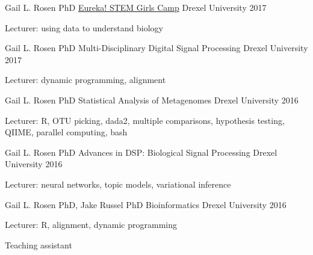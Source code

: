 



\begin{cventries}

\cventry
    {Gail L. Rosen PhD}
    {\href{https://drexel.edu/engineering/academics/high-school-programs/eureka/}{Eureka! STEM Girls Camp}}
    {Drexel University}
    {2017}
    {\begin{cvitems}
        \item Lecturer: using data to understand biology
    \end{cvitems}}
    
\cventry
    {Gail L. Rosen PhD}
    {Multi-Disciplinary Digital Signal Processing}
    {Drexel University}
    {2017}
    {\begin{cvitems}
        \item Lecturer: dynamic programming, alignment
    \end{cvitems}}
    
\cventry
    {Gail L. Rosen PhD}
    {Statistical Analysis of Metagenomes}
    {Drexel University}
    {2016}
    {\begin{cvitems}
        \item Lecturer: R, OTU picking, dada2, multiple comparisons, hypothesis testing, QIIME, parallel computing, bash
    \end{cvitems}}
\cventry
    {Gail L. Rosen PhD}
    {Advances in DSP: Biological Signal Processing}
    {Drexel University}
    {2016}
    {\begin{cvitems}
        \item Lecturer: neural networks, topic models, variational inference
    \end{cvitems}}
    
\cventry
    {Gail L. Rosen PhD, Jake Russel PhD}
    {Bioinformatics}
    {Drexel University}
    {2016}
    {\begin{cvitems}
        \item Lecturer: R, alignment, dynamic programming
        \item Teaching assistant
    \end{cvitems}}
    

\end{cventries}

